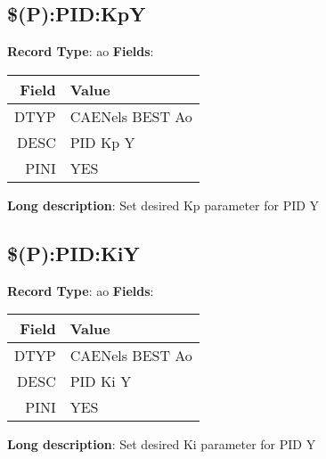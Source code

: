 \subsection{\$(P):PID:KpY}
\textbf{Record Type}: ao \newline \newline 
\textbf{Fields}: \newline 
\begin{tabularx}{0.7\linewidth}{|r|X|}
\hline Field & Value \\
\hline
\hline
DTYP & CAENels BEST Ao\\
\hline
DESC & PID Kp Y\\
\hline
PINI & YES\\
\hline
\end{tabularx}
\newline \newline \newline
\textbf{Long description}: \newline 
 Set desired Kp parameter for PID Y
\newline \newline

\subsection{\$(P):PID:KiY}
\textbf{Record Type}: ao \newline \newline 
\textbf{Fields}: \newline 
\begin{tabularx}{0.7\linewidth}{|r|X|}
\hline Field & Value \\
\hline
\hline
DTYP & CAENels BEST Ao\\
\hline
DESC & PID Ki Y\\
\hline
PINI & YES\\
\hline
\end{tabularx}
\newline \newline \newline
\textbf{Long description}: \newline 
 Set desired Ki parameter for PID Y
\newline \newline

